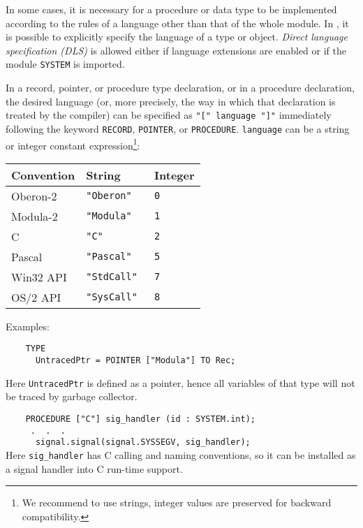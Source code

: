 In some cases, it is necessary for a procedure or data type to be
implemented according to the rules of a language other than that
of the whole module. In \xds{}, it is possible to explicitly
specify the language of a type or object. {\em Direct language
specification (DLS)} is allowed either if
language extensions are enabled or if the module \verb'SYSTEM' is imported.

In a record, pointer, or procedure type declaration, or in a procedure declaration,
the desired language (or, more precisely, the way in which that
declaration is treated by the compiler) can be specified as \verb'"[" language "]"'
immediately following the keyword \verb'RECORD', \verb'POINTER',
or \verb'PROCEDURE'. \verb'language' can be a string or integer constant
expression\footnote{We recommend to use strings, integer values are
preserved for backward compatibility.}:
\begin{center}
\begin{tabular}{lll}
\bf Convention & \bf String    & \bf Integer \\
\hline
Oberon-2       & \tt "Oberon"  & \tt 0       \\
Modula-2       & \tt "Modula"  & \tt 1       \\
C              & \tt "C"       & \tt 2       \\
Pascal         & \tt "Pascal"  & \tt 5       \\
Win32 API      & \tt "StdCall" & \tt 7       \\
OS/2 API       & \tt "SysCall" & \tt 8       \\
\end{tabular}
\end{center}

Examples:

\verb'    TYPE'\\
\verb'      UntracedPtr = POINTER ["Modula"] TO Rec;'

Here {\tt UntracedPtr} is defined as a \mt{} pointer, hence all variables
of that type will not be traced by garbage collector.

\verb'    PROCEDURE ["C"] sig_handler (id : SYSTEM.int);'\\
\verb'     .  .  .'\\
\verb'      signal.signal(signal.SYSSEGV, sig_handler);'\\

Here \verb'sig_handler' has C calling and naming conventions, so it
can be installed as a signal handler into C run-time support.

